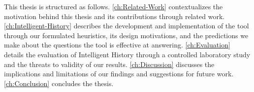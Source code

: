 This thesis is structured as follows. 
\autoref{ch:Related-Work} contextualizes the motivation behind this thesis and its contributions through related work. 
\autoref{ch:Intelligent-History} describes the development and implementation of the tool through our formulated heuristics, 
its design motivations, and the predictions we make about the questions the tool is effective at answering. 
\autoref{ch:Evaluation} details the evaluation of Intelligent History through a controlled laboratory study and the threats to validity of our results.
\autoref{ch:Discussion} discusses the implications and limitations of our findings and suggestions for future work.
\autoref{ch:Conclusion} concludes the thesis.

\endinput

Any text after an \endinput is ignored.
You could put scraps here or things in progress.
